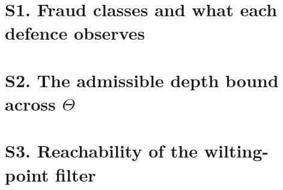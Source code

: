 \section*{S1. Fraud classes and what each defence observes}

\begin{table}[!h]
\centering
\caption{The three forgeable quantities of Eq.~(7) in the main text
and which fraud class alters each. ``true'' means the quantity is preserved, so
the corresponding defence is blind by Prop.~1 in the main text.}
\footnotesize

\end{table}

\section*{S2. The admissible depth bound across $\Theta$}

\begin{table}[!h]
\centering
\caption{The admissible depth bound $u_{\max}$ (Eq.~(16) in the main text) across
the FAO-56 Table 2 range. The original single value $61$\,mm is one
row of this table.}
\footnotesize

\end{table}

\section*{S3. Reachability of the wilting-point filter}

\begin{table}[!h]
\centering
\caption{Reachability of the wilting-point filter over $150$
configurations with an empty log, i.e.\ the driest forcing available.}
\footnotesize

\end{table}





\begin{table}[!h]
\centering
\caption{MRV cost per hectare per season for the four
architectures. Monitoring dominates MRV cost, so the architecture that avoids
dedicated sensing wins on labour rather than hardware.}
\label{tab:baseline}
\footnotesize

\end{table}

